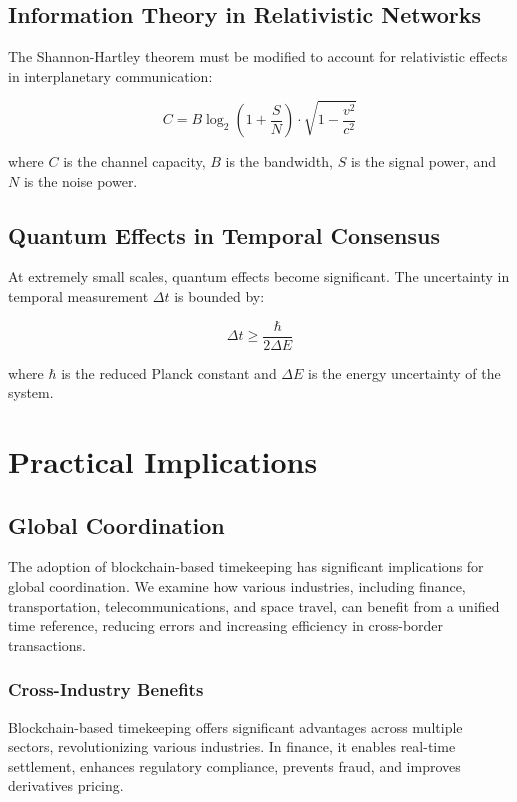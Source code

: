 \documentclass[12pt]{report}
\begin{document}
\section{Information Theory in Relativistic Networks}
The Shannon-Hartley theorem must be modified to account for relativistic effects in interplanetary communication:

\begin{equation}
C = B \log_2 \left(1 + \frac{S}{N}\right) \cdot \sqrt{1 - \frac{v^2}{c^2}}
\end{equation}

where \( C \) is the channel capacity, \( B \) is the bandwidth, \( S \) is the signal power, and \( N \) is the noise power.

\section{Quantum Effects in Temporal Consensus}
At extremely small scales, quantum effects become significant. The uncertainty in temporal measurement \( \Delta t \) is bounded by:

\begin{equation}
\Delta t \geq \frac{\hbar}{2\Delta E}
\end{equation}

where \( \hbar \) is the reduced Planck constant and \( \Delta E \) is the energy uncertainty of the system.

\chapter{Practical Implications}

\section{Global Coordination}
The adoption of blockchain-based timekeeping has significant implications for global coordination. We examine how various industries, including finance, transportation, telecommunications, and space travel, can benefit from a unified time reference, reducing errors and increasing efficiency in cross-border transactions.

\subsection{Cross-Industry Benefits}
Blockchain-based timekeeping offers significant advantages across multiple sectors, revolutionizing various industries. In finance, it enables real-time settlement, enhances regulatory compliance, prevents fraud, and improves derivatives pricing. 
\end{document}
